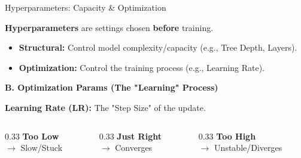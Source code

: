 \begin{frame}{Hyperparameters: Capacity \& Optimization}

    \begin{block}{}
        \textbf{Hyperparameters} are settings chosen \textbf{before} training.
        \begin{itemize}
            \item \textbf{Structural:} Control model complexity/capacity (e.g., Tree Depth, Layers).
            \item \textbf{Optimization:} Control the training process (e.g., Learning Rate).
        \end{itemize}
    \end{block}

    \vspace{0.5em}
    \centering
    
    \textbf{B. Optimization Params (The "Learning" Process)}
    \begin{tcolorbox}[colback=gray!10, colframe=gray!60, boxrule=0.5pt]
        \centering
        \small
        \textbf{Learning Rate (LR):} The "Step Size" of the update.
        \vspace{0.3em}
        \begin{columns}[c]
            \begin{column}{0.33\textwidth}
                \centering \scriptsize \textbf{Too Low} \\ $\to$ Slow/Stuck
            \end{column}
            \begin{column}{0.33\textwidth}
                \centering \scriptsize \textbf{Just Right} \\ $\to$ Converges
            \end{column}
            \begin{column}{0.33\textwidth}
                \centering \scriptsize \textbf{Too High} \\ $\to$ Unstable/Diverges
            \end{column}
        \end{columns}
    \end{tcolorbox}

\end{frame}



